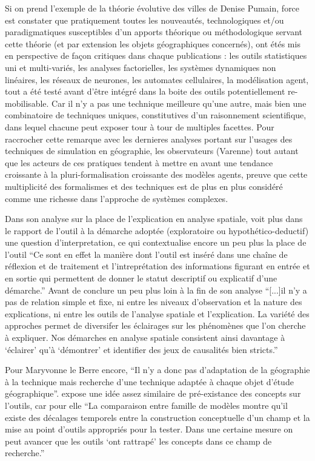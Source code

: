 Si on prend l'exemple de la théorie évolutive des villes de Denise Pumain, force est constater que pratiquement toutes les nouveautés, technologiques et/ou paradigmatiques susceptibles d'un apports théorique ou méthodologique servant cette théorie (et par extension les objets géographiques concernés), ont étés mis en perspective de façon critiques dans chaque publications : les outils statistiques uni et multi-variés, les analyses factorielles, les systèmes dynamiques non linéaires, les réseaux de neurones, les automates cellulaires, la modélisation agent, tout a été testé avant d'être intégré dans la boite des outils potentiellement re-mobilisable. Car il n'y a pas une technique meilleure qu'une autre, mais bien une combinatoire de techniques uniques, constitutives d'un raisonnement scientifique, dans lequel chacune peut exposer tour à tour de multiples facettes. Pour raccrocher cette remarque avec les dernieres analyses portant sur l'usages des techniques de simulation en géographie, les observateurs (Varenne) tout autant que les acteurs \autocite{Sanders2013} de ces pratiques tendent à mettre en avant une tendance croissante à la pluri-formalisation croissante des modèles agents, preuve que cette multiplicité des formalismes et des techniques est de plus en plus considéré comme une richesse dans l'approche de systèmes complexes.

Dans son analyse sur la place de l'explication en analyse spatiale, \textcite{Sanders2000} voit plus dans le rapport de l'outil à la démarche adoptée (exploratoire ou hypothético-deductif) une question d'interpretation, ce qui contextualise encore un peu plus la place de l'outil \enquote{Ce sont en effet la manière dont l'outil est inséré dans une chaîne de réflexion et de traitement et l'intreprétation des informations figurant en entrée et en sortie qui permettent de donner le statut descriptif ou explicatif d'une démarche.} Avant de conclure un peu plus loin à la fin de son analyse \enquote{[...]il n'y a pas de relation simple et fixe, ni entre les niveaux d'observation et la nature des explications, ni entre les outils de l'analyse spatiale et l'explication. La variété des approches permet de diversifer les éclairages sur les phénomènes que l'on cherche à expliquer. Nos démarches en analyse spatiale consistent ainsi davantage à \enquote{éclairer} qu'à \enquote{démontrer} et identifier des jeux de causalités bien stricts.}

Pour Maryvonne le Berre encore, \enquote{Il n’y a donc pas d’adaptation de la géographie à la technique mais recherche d’une technique adaptée à chaque objet d’étude géographique}. \textcite{Sanders2013} expose une idée assez similaire de pré-existance des concepts sur l'outils, car pour elle \enquote{La comparaison entre famille de modèles montre qu'il existe des décalages temporels entre la construction conceptuelle d'un champ et la mise au point d'outils appropriés pour la tester. Dans une certaine mesure on peut avancer que les outils \enquote{ont rattrapé} les concepts dans ce champ de recherche.}

